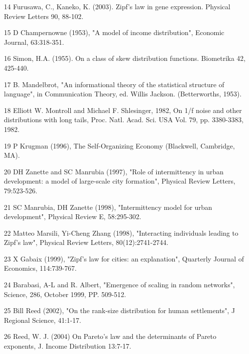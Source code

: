 \documentclass[10pt,a4paper]{article}
\begin{document}
\begin{thebibliography}{99a}
\item[14] Furusawa, C., Kaneko, K. (2003). Zipf's law in gene expression. Physical Review Letters 90, 88-102.


\item[15] D Champernowne (1953), "A model of income distribution", Economic Journal, 63:318-351.

\item[16] Simon, H.A. (1955). On a class of skew distribution functions. Biometrika 42, 425-440.

\item[17] B. Mandelbrot, "An informational theory of the statistical structure of language", in Communication Theory, ed. Willis Jackson. (Betterworths, 1953).

\item[18] Elliott W. Montroll and Michael F. Shlesinger, 1982, On 1/f noise and other distributions with long tails, Proc. Natl. Acad. Sci. USA Vol. 79, pp. 3380-3383, 1982.

\item[19] P Krugman (1996), The Self-Organizing Economy (Blackwell, Cambridge, MA).

\item[20] DH Zanette and SC Manrubia (1997), "Role of intermittency in urban development: a model of large-scale city formation", Physical Review Letters, 79:523-526. 

\item[21] SC Manrubia, DH Zanette (1998), 
"Intermittency model for urban development", Physical Review E, 58:295-302.

\item[22] Matteo Marsili, Yi-Cheng Zhang (1998), "Interacting individuals leading to Zipf's law", Physical Review Letters, 80(12):2741-2744. 

\item[23] X Gabaix (1999), "Zipf's law for cities: an explanation", Quarterly Journal of Economics, 114:739-767.

\item[24] Barabasi, A-L and R. Albert, "Emergence of scaling in random networks", Science, 286, October 1999, PP. 509-512. 

\item[25] Bill Reed (2002), "On the rank-size distribution for human settlements", J Regional Science, 41:1-17. 

\item[26] Reed, W. J. (2004) On Pareto's law and the determinants of Pareto exponents, J. Income Distribution 13:7-17.


\end{thebibliography}
\end{document}
